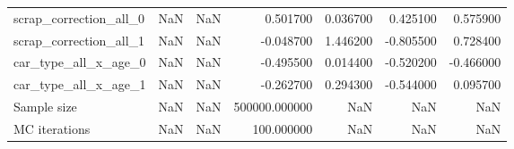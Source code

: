 \begin{tabular}{lrlrrrr}
scrap_correction_all_0 & NaN & NaN & 0.501700 & 0.036700 & 0.425100 & 0.575900 \\
scrap_correction_all_1 & NaN & NaN & -0.048700 & 1.446200 & -0.805500 & 0.728400 \\
car_type_all_x_age_0 & NaN & NaN & -0.495500 & 0.014400 & -0.520200 & -0.466000 \\
car_type_all_x_age_1 & NaN & NaN & -0.262700 & 0.294300 & -0.544000 & 0.095700 \\
Sample size & NaN & NaN & 500000.000000 & NaN & NaN & NaN \\
MC iterations & NaN & NaN & 100.000000 & NaN & NaN & NaN \\
\bottomrule
\end{tabular}
